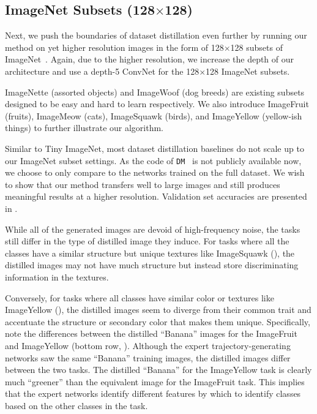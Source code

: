 \subsection{ImageNet Subsets (128$\times$128)}

Next, we push the boundaries of dataset distillation even further by running our method on yet higher resolution images in the form of 128$\times$128 subsets of ImageNet~\cite{deng2009imagenet}. Again, due to the higher resolution, we increase the depth of our architecture and use a depth-5 ConvNet for the 128$\times$128 ImageNet subsets.


ImageNette (assorted objects) and ImageWoof (dog breeds) are existing subsets~\cite{imagenette} designed to be easy and hard to learn respectively. We also introduce ImageFruit (fruits), ImageMeow (cats), ImageSquawk (birds), and ImageYellow (yellow-ish things) to further illustrate our algorithm. %

Similar to Tiny ImageNet, most dataset distillation baselines do not scale up to our ImageNet subset settings.
As the code of \texttt{DM}~\cite{dm} is not publicly available now, we choose to only compare to the networks trained on the full dataset. We wish to show that our method transfers well to large images and still produces meaningful results at a higher resolution. Validation set accuracies are presented in .

While all of the generated images are devoid of high-frequency noise, the tasks still differ in the type of distilled image they induce. For tasks where all the classes have a similar structure but unique textures like ImageSquawk (), the distilled images may not have much structure but instead store discriminating information in the textures.

Conversely, for tasks where all classes have similar color or textures like ImageYellow (), the distilled images seem to diverge from their common trait and accentuate the structure or secondary color that makes them unique. Specifically, note the differences between the distilled ``Banana'' images for the ImageFruit and ImageYellow (bottom row, ). Although the expert trajectory-generating networks saw the same ``Banana'' training images, the distilled images differ between the two tasks. The distilled ``Banana'' for the ImageYellow task is clearly much ``greener'' than the equivalent image for the ImageFruit task. This implies that the expert networks identify different features by which to identify classes based on the other classes in the task.


















